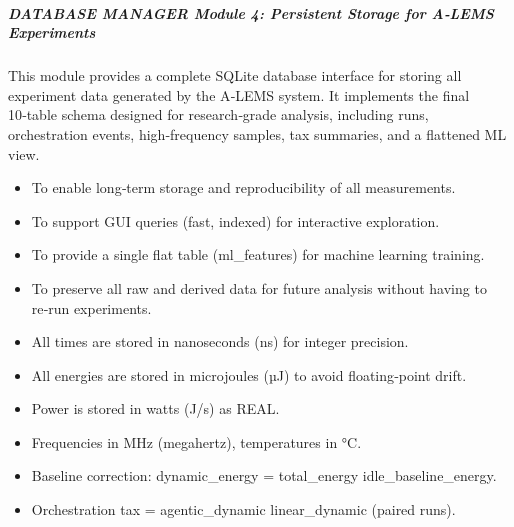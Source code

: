 \documentclass[letterpaper,10pt,english]{sphinxmanual}
\begin{document}
\subparagraph{DATABASE MANAGER \textendash{} Module 4: Persistent Storage for A‑LEMS Experiments}
\label{\detokenize{core.database.manager_oldversion:database-manager-module-4-persistent-storage-for-alems-experiments}}\begin{description}
\sphinxAtStartPar
This module provides a complete SQLite database interface for storing
all experiment data generated by the A‑LEMS system. It implements the
final 10‑table schema designed for research‑grade analysis, including
runs, orchestration events, high‑frequency samples, tax summaries,
and a flattened ML view.

\begin{itemize}
\item {} 
\sphinxAtStartPar
To enable long‑term storage and reproducibility of all measurements.

\item {} 
\sphinxAtStartPar
To support GUI queries (fast, indexed) for interactive exploration.

\item {} 
\sphinxAtStartPar
To provide a single flat table (ml\_features) for machine learning training.

\item {} 
\sphinxAtStartPar
To preserve all raw and derived data for future analysis without
having to re‑run experiments.

\end{itemize}

\begin{itemize}
\item {} 
\sphinxAtStartPar
All times are stored in nanoseconds (ns) for integer precision.

\item {} 
\sphinxAtStartPar
All energies are stored in microjoules (µJ) to avoid floating‑point drift.

\item {} 
\sphinxAtStartPar
Power is stored in watts (J/s) as REAL.

\item {} 
\sphinxAtStartPar
Frequencies in MHz (megahertz), temperatures in °C.

\item {} 
\sphinxAtStartPar
Baseline correction: dynamic\_energy = total\_energy \sphinxhyphen{} idle\_baseline\_energy.

\item {} 
\sphinxAtStartPar
Orchestration tax = agentic\_dynamic \sphinxhyphen{} linear\_dynamic (paired runs).


\end{itemize}
\end{description}
\end{document}
